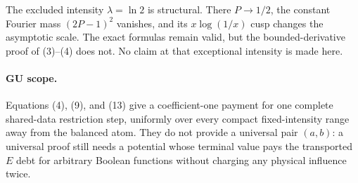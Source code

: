 The excluded intensity $\lambda=\ln2$ is structural.  There
$P\to1/2$, the constant Fourier mass $(2P-1)^2$ vanishes, and its
$x\log(1/x)$ cusp changes the asymptotic scale.  The exact formulas remain
valid, but the bounded-derivative proof of (3)--(4) does not.  No claim at
that exceptional intensity is made here.

\paragraph{GU scope.}
Equations (4), (9), and (13) give a coefficient-one payment for one
complete shared-data restriction step, uniformly over every compact
fixed-intensity range away from the balanced atom.  They do not provide a
universal pair $(a,b)$: a universal proof still needs a potential whose
terminal value pays the transported $E$ debt for arbitrary Boolean
functions without charging any physical influence twice.
